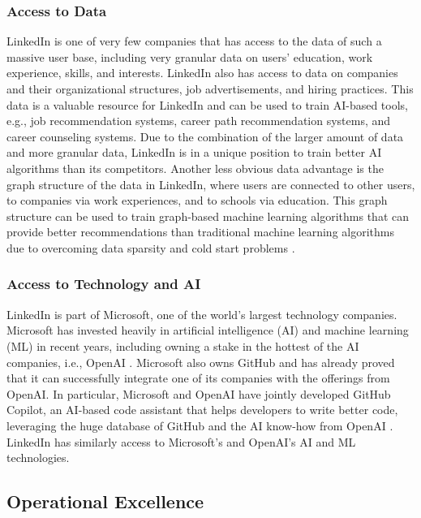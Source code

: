 \subsubsection{Access to Data}

LinkedIn is one of very few companies that has access to the data of such a massive user base, including
very granular data on users' education, work experience, skills, and interests. LinkedIn also has access
to data on companies and their organizational structures, job advertisements, and hiring practices. This
data is a valuable resource for LinkedIn and can be used to train AI-based tools, e.g., job recommendation
systems, career path recommendation systems, and career counseling systems. Due to the combination of the
larger amount of data and more granular data, LinkedIn is in a unique position to train better AI algorithms
than its competitors. Another less obvious data advantage is the graph structure of the data in LinkedIn,
where users are connected to other users, to companies via work experiences, and to schools via education.
This graph structure can be used to train graph-based machine learning algorithms that can provide better
recommendations than traditional machine learning algorithms due to overcoming data sparsity and cold start
problems \citep{zhangRecommendingGraphsComprehensive2023}.

\subsubsection{Access to Technology and AI}

LinkedIn is part of Microsoft, one of the world's largest technology companies. Microsoft has invested heavily
in artificial intelligence (AI) and machine learning (ML) in recent years, including owning a stake in the hottest
of the AI companies, i.e., OpenAI \citep{openaiAnnouncementOpenAIMicrosoft2023}. Microsoft also owns GitHub and has
already proved that it can successfully integrate one of its companies with the offerings from OpenAI. In particular,
Microsoft and OpenAI have jointly developed GitHub Copilot, an AI-based code assistant that helps developers to write
better code, leveraging the huge database of GitHub and the AI know-how from OpenAI \citep{novetMicrosoftOpenAIHave2021}.
LinkedIn has similarly access to Microsoft's and OpenAI's AI and ML technologies. 

\subsection{Operational Excellence}

